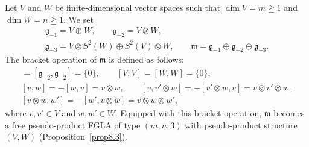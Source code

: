 \begin{example}
Let $V$ and $W$ be f\/inite-dimensional vector spaces
such that $\dim V=m\geqq1$ and $\dim W=n\geqq1$.
We set
\begin{gather*}
\mathfrak g_{-1}  =V\oplus W, \qquad \mathfrak g_{-2}=V\otimes W, \\
\mathfrak g_{-3}  = V\otimes S^2(W)\oplus S^2(V)\otimes W,
\qquad \mathfrak m=\mathfrak g_{-1}\oplus \mathfrak g_{-2}\oplus
\mathfrak g_{-3}.
\end{gather*}
The bracket operation of $\mathfrak m$ is def\/ined as follows:
 \begin{gather*}
  [\mathfrak g_{-3},\mathfrak g_{-1}\oplus \mathfrak g_{-2}]
=[\mathfrak g_{-2},\mathfrak g_{-2}]=\{0\},  \qquad [V,V]=[W,W]=\{0\},\\
[v,w]=-[w,v]=v\otimes w, \qquad
  [v,v'\otimes w]=-[v'\otimes w,v]=v\circledcirc v'\otimes w,
\\ [v\otimes w,w']=-[w',v\otimes w]=v\otimes w\circledcirc w',
\end{gather*}
where $v,v'\in V$ and $w,w'\in W$.
Equipped with this bracket operation, $\mathfrak m$ becomes
a free pseudo-product FGLA of type $(m,n,3)$ with pseudo-product structure
$(V,W)$ (Proposition~\ref{prop8.3}).
\end{example}
